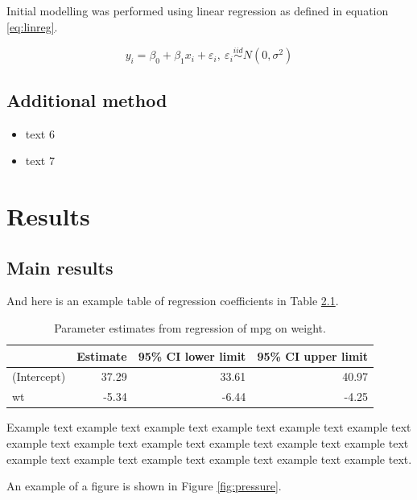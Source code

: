 \documentclass[]{book}
\providecommand{\tightlist}{%
  \setlength{\itemsep}{0pt}\setlength{\parskip}{0pt}}
\begin{document}
Initial modelling was performed using linear regression as defined in equation \eqref{eq:linreg}.

\begin{equation}
y_i = \beta_0 + \beta_1x_i + \varepsilon_i,\  \varepsilon_i \overset{iid}{\sim} N(0, \sigma^2)
\label{eq:linreg}
\end{equation}

\hypertarget{additional-method}{%
\section{Additional method}\label{additional-method}}

\begin{itemize}
\tightlist
\item
  text 6
\item
  text 7
\end{itemize}

\hypertarget{results}{%
\chapter{Results}\label{results}}

\hypertarget{main-results}{%
\section{Main results}\label{main-results}}

And here is an example table of regression coefficients in Table \ref{tab:mtreg}.

\begin{table}[H]

\caption{\label{tab:mtreg}Parameter estimates from regression of mpg on weight.}
\centering
\begin{tabular}{lrrr}
\toprule
  & Estimate & 95\% CI lower limit & 95\% CI upper limit\\
\midrule
(Intercept) & 37.29 & 33.61 & 40.97\\
wt & -5.34 & -6.44 & -4.25\\
\bottomrule
\end{tabular}
\end{table}

Example text example text example text example text example text example text example text example text example text example text example text example text example text example text example text example text example text example text.

An example of a figure is shown in Figure \ref{fig:pressure}.
\end{document}

